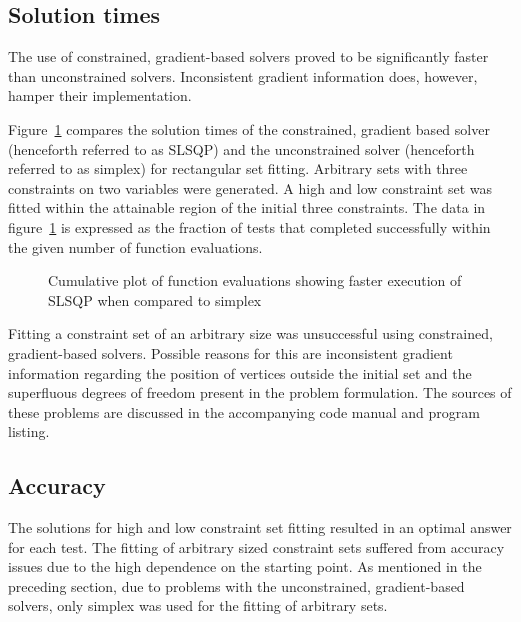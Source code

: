 \subsection{Solution times}
The use of constrained, gradient-based solvers proved to be significantly faster than unconstrained solvers.
Inconsistent gradient information does, however, hamper their implementation.

Figure~\ref{fig:cubefittime} compares the solution times of the constrained, gradient based solver (henceforth referred to as SLSQP) and the unconstrained solver (henceforth referred to as simplex) for rectangular set fitting.
Arbitrary sets with three constraints on two variables were generated.
A high and low constraint set was fitted within the attainable region of the initial three constraints.
The data in figure~\ref{fig:cubefittime} is expressed as the fraction of tests that completed successfully within the given number of function evaluations.

\begin{figure}[htbp]
  \centering
    \scalebox{1}{}  
  \caption[SLSQP and simplex calculation time comparison]{Cumulative plot of function evaluations showing faster execution of SLSQP when compared to simplex}
  \label{fig:cubefittime}
\end{figure}

Fitting a constraint set of an arbitrary size was unsuccessful using constrained, gradient-based solvers.
Possible reasons for this are inconsistent gradient information regarding the position of vertices outside the initial set and the superfluous degrees of freedom present in the problem formulation.
The sources of these problems are discussed in the accompanying code manual and program listing.

\subsection{Accuracy}\label{sec:fittingaccuracy}
The solutions for high and low constraint set fitting resulted in an optimal answer for each test.
The fitting of arbitrary sized constraint sets suffered from accuracy issues due to the high dependence on the starting point.
As mentioned in the preceding section, due to problems with the unconstrained, gradient-based solvers, only simplex was used for the fitting of arbitrary sets.

